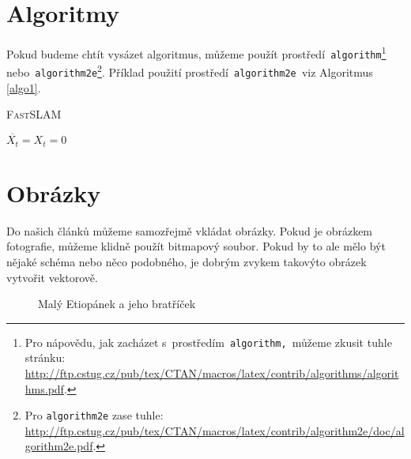 \documentclass[a4paper, 11pt]{article}
\begin{document}
\section{Algoritmy}\label{algoritmy}
Pokud budeme chtít vysázet algoritmus, můžeme použít prostředí\texttt{ algorithm}\footnote{Pro nápovědu, jak zacházet s~prostředím\texttt{ algorithm, }můžeme zkusit tuhle stránku:\\\href{http://ftp.cstug.cz/pub/tex/CTAN/macros/latex/contrib/algorithms/algorithms.pdf}{http://ftp.cstug.cz/pub/tex/CTAN/macros/latex/contrib/algorithms/algorithms.pdf}.} nebo\texttt{ algorithm2e}\footnote{Pro \texttt{algorithm2e} zase tuhle: \href{http://ftp.cstug.cz/pub/tex/CTAN/macros/latex/contrib/algorithm2e/doc/algorithm2e.pdf}{http://ftp.cstug.cz/pub/tex/CTAN/macros/latex/contrib/algorithm2e/doc/algorithm2e.pdf}.}. Příklad použití prostředí\texttt{ algorithm2e }viz Algoritmus \ref*{algo1}.

\begin{algorithm}\label{algo1}
\caption{\textsc{FastSLAM}}
\SetNlSty{}{}{:}
\BlankLine
\SetNlSkip{-0.55cm}
\Indp \Indp
$\overline{X_{t}}=X_{t}=0$ \\
\end{algorithm}

\section{Obrázky}
Do našich článků můžeme samozřejmě vkládat obrázky. Pokud je obrázkem fotografie, můžeme klidně použít bitmapový soubor. Pokud by to ale mělo být nějaké schéma nebo něco podobného, je dobrým zvykem takovýto obrázek vytvořit vektorově.

\begin{figure}[h]
\begin{center}
\caption{Malý Etiopánek a jeho bratříček}\label{fig:etiopanek}
\end{center}
\end{figure}
\end{document}

